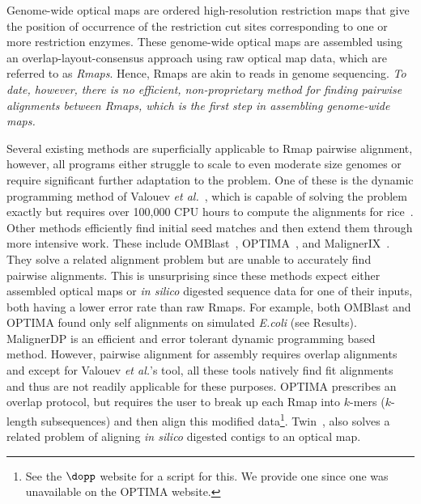 \documentclass[doctor]{thesis}
\begin{document}
Genome-wide optical maps are ordered high-resolution restriction maps that give the position of occurrence of the restriction cut sites corresponding to one or more restriction enzymes.  These genome-wide optical maps are assembled using an overlap-layout-consensus approach using  raw optical map data, which are referred to as {\em Rmaps}.  Hence, Rmaps are akin to reads in genome sequencing.  
{\em To date, however, there is no efficient, non-proprietary method for finding pairwise alignments between Rmaps, which is the first step in assembling genome-wide maps.} 

Several existing methods are superficially applicable to Rmap pairwise alignment, however, all programs either struggle to scale to even moderate size genomes or require significant further adaptation to the problem. One of these is the  dynamic programming method of Valouev {\it et al.}~\cite{Valouev06}, which is capable of solving the problem exactly but requires over 100,000 CPU hours to compute the alignments for rice~\cite{valouev2006algorithm}.   Other methods efficiently find initial seed matches and then extend them through more intensive work.  These include OMBlast~\cite{omblast}, OPTIMA~\cite{optima}, and MalignerIX~\cite{maligner}.  They solve a related alignment problem but are unable to accurately find  pairwise alignments.  This is unsurprising since these methods expect either assembled optical maps or \emph{in silico} digested sequence data for one of their inputs, both having a lower error rate than raw Rmaps.  For example, both OMBlast and OPTIMA found only self alignments on simulated {\em E.coli} (see Results).  MalignerDP is an efficient and error tolerant dynamic programming based method.  However, pairwise alignment for assembly requires overlap alignments and except for Valouev {\it et al.}'s tool, all these tools natively find fit alignments and thus are not readily applicable for these purposes.  OPTIMA prescribes an overlap protocol, but requires the user to break up each Rmap into $k$-mers ($k$-length subsequences) and then align this modified data\footnote{See the $\dopp$ website for a script for this. We provide one since one was unavailable on the OPTIMA website.}. Twin~\cite{wabi2014}, also solves a related problem of aligning {\em in silico } digested contigs to an optical map. 
    
\end{document}
